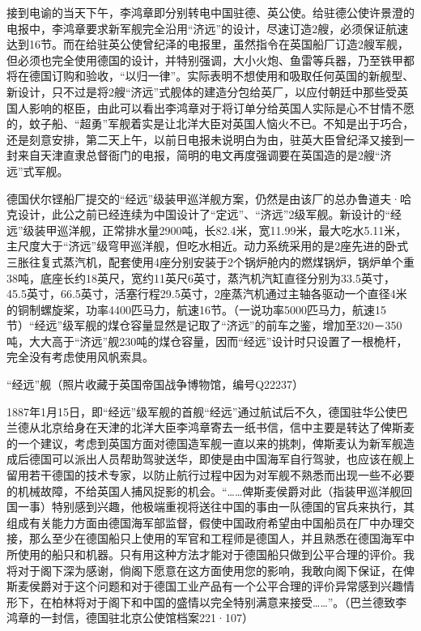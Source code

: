 \documentclass[12pt,UTF8]{ctexbook}
\begin{document}
接到电谕的当天下午，李鸿章即分别转电中国驻德、英公使。给驻德公使许景澄的电报中，李鸿章要求新军舰完全沿用“济远”的设计，尽速订造2艘，必须保证航速达到16节。而在给驻英公使曾纪泽的电报里，虽然指令在英国船厂订造2艘军舰，但必须也完全使用德国的设计，并特别强调，大小火炮、鱼雷等兵器，乃至铁甲都将在德国订购和验收，“以归一律”。实际表明不想使用和吸取任何英国的新舰型、新设计，只不过是将2艘“济远”式舰体的建造分包给英厂，以应付朝廷中那些受英国人影响的枢臣，由此可以看出李鸿章对于将订单分给英国人实际是心不甘情不愿的，蚊子船、“超勇”军舰着实是让北洋大臣对英国人恼火不已。不知是出于巧合，还是刻意安排，第二天上午，以前日电报未说明白为由，驻英大臣曾纪泽又接到一封来自天津直隶总督衙门的电报，简明的电文再度强调要在英国造的是2艘“济远”式军舰。

德国伏尔铿船厂提交的“经远”级装甲巡洋舰方案，仍然是由该厂的总办鲁道夫·哈克设计，此公之前已经连续为中国设计了“定远”、“济远”2级军舰。新设计的“经远”级装甲巡洋舰，正常排水量2900吨，长82.4米，宽11.99米，最大吃水5.11米，主尺度大于“济远”级穹甲巡洋舰，但吃水相近。动力系统采用的是2座先进的卧式三胀往复式蒸汽机，配套使用4座分别安装于2个锅炉舱内的燃煤锅炉，锅炉单个重38吨，底座长约18英尺，宽约11英尺6英寸，蒸汽机汽缸直径分别为33.5英寸，45.5英寸，66.5英寸，活塞行程29.5英寸，2座蒸汽机通过主轴各驱动一个直径4米的铜制螺旋桨，功率4400匹马力，航速16节。（一说功率5000匹马力，航速15节）“经远”级军舰的煤仓容量显然是记取了“济远”的前车之鉴，增加至320－350吨，大大高于“济远”舰230吨的煤仓容量，因而“经远”设计时只设置了一根桅杆，完全没有考虑使用风帆索具。

“经远”舰（照片收藏于英国帝国战争博物馆，编号Q22237）

1887年1月15日，即“经远”级军舰的首舰“经远”通过航试后不久，德国驻华公使巴兰德从北京给身在天津的北洋大臣李鸿章寄去一纸书信，信中主要是转达了俾斯麦的一个建议，考虑到英国方面对德国造军舰一直以来的挑刺，俾斯麦认为新军舰造成后德国可以派出人员帮助驾驶送华，即使是由中国海军自行驾驶，也应该在舰上留用若干德国的技术专家，以防止航行过程中因为对军舰不熟悉而出现一些不必要的机械故障，不给英国人捕风捉影的机会。“……俾斯麦侯爵对此（指装甲巡洋舰回国一事）特别感到兴趣，他极端重视将送往中国的事由一队德国的官兵来执行，其组成有关能力方面由德国海军部监督，假使中国政府希望由中国船员在厂中办理交接，那么至少在德国船只上使用的军官和工程师是德国人，并且熟悉在德国海军中所使用的船只和机器。只有用这种方法才能对于德国船只做到公平合理的评价。我将对于阁下深为感谢，倘阁下愿意在这方面使用您的影响，我敢向阁下保证，在俾斯麦侯爵对于这个问题和对于德国工业产品有一个公平合理的评价异常感到兴趣情形下，在柏林将对于阁下和中国的盛情以完全特别满意来接受……”。（巴兰德致李鸿章的一封信，德国驻北京公使馆档案221·107）
\end{document}
